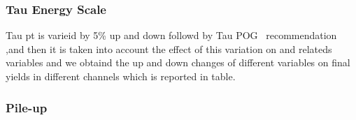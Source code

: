 
\subsubsection{Tau Energy Scale}
Tau pt is varieid by 5\% up and down followd by Tau POG~\cite{TauPOG} recommendation ,and then it is taken into account the effect of this variation on \met and \pT relateds variables and we obtaind the up and down changes of different variables on final yields in different channels which is reported in table.
   

\subsubsection{Pile-up}
